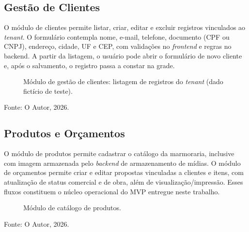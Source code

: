 \subsection{Gestão de Clientes}

O módulo de clientes permite listar, criar, editar e excluir registros vinculados ao \textit{tenant}. O formulário contempla nome, e-mail, telefone, documento (CPF ou CNPJ), endereço, cidade, UF e CEP, com validações no \textit{frontend} e regras no backend. A partir da listagem, o usuário pode abrir o formulário de novo cliente e, após o salvamento, o registro passa a constar na grade.
\begin{figure}[H]
  \centering
  \captionsetup{justification=centering}
  \caption{Módulo de gestão de clientes: listagem de registros do \textit{tenant} (dado fictício de teste).}
  \label{fig:clientes}
\end{figure}
{\centering\small Fonte: O Autor, 2026.\par}
\vspace{0.8em}


\subsection{Produtos e Orçamentos}

O módulo de produtos permite cadastrar o catálogo da marmoraria, inclusive com imagem armazenada pelo \textit{backend} de armazenamento de mídias. O módulo de orçamentos permite criar e editar propostas vinculadas a clientes e itens, com atualização de status comercial e de obra, além de visualização/impressão. Esses fluxos constituem o núcleo operacional do MVP entregue neste trabalho.
\begin{figure}[H]
  \centering
  \captionsetup{justification=centering}
  \caption{Módulo de catálogo de produtos.}
  \label{fig:produtos}
\end{figure}
{\centering\small Fonte: O Autor, 2026.\par}
\vspace{0.8em}

